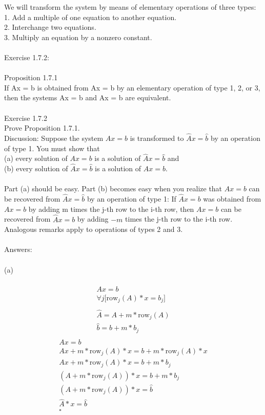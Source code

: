 \documentclass[10pt,a4paper]{article}
\author{Daniel Frederico Lins Leite}
\begin{document}
	We will transform the system by means of elementary operations of three types:\\ 
	1. Add a multiple of one equation to another equation.\\ 
	2. Interchange two equations.\\ 
	3. Multiply an equation by a nonzero constant.\\ 
	\\
	Exercise 1.7.2:\\
	\\
	Proposition 1.7.1\\
	If Ax = b is obtained from Ax = b by an elementary operation of type 1, 2, or 3, then the systems Ax = b and Ax = b are equivalent.\\
	\\
	Exercise 1.7.2\\
	Prove Proposition 1.7.1.\\
	Discussion: Suppose the system $Ax = b$ is transformed to $\hat{A}x = \hat{b}$ by an operation of type 1. You must show that\\
	(a) every solution of $Ax = b$ is a solution of $\hat{A}x = \hat{b}$ and\\
	(b) every solution of $\hat{A}x = \hat{b}$ is a solution of $Ax = b$.\\
	\\
	Part (a) should be easy. Part (b) becomes easy when you realize that $Ax = b$ can be recovered from $\hat{A}x = \hat{b}$ by an operation of type 1: If $\hat{A}x = b$ was obtained from $Ax = b$ by adding m times the j-th row to the i-th row, then $Ax = b$ can be recovered from $\hat{A}x = b$ by adding $-m$ times the j-th row to the i-th row. Analogous remarks apply to operations of types 2 and 3.\\
	\\
	Answers:\\
	\\
	(a)\\
	\\
	\begin{align*}
		Ax = b\\
		\forall{j} \big[ \text{row}_j(A) * x = b_j \big]\\
		\\
		\hat{A} = A + m*\text{row}_j(A)\\
		\hat{b} = b + m*b_j\\	
	\end{align*}
	\begin{align*}	
		Ax = b\\
		Ax + m*\text{row}_j(A)*x = b + m*\text{row}_j(A)*x\\		
		Ax + m*\text{row}_j(A)*x = b + m*b_j\\
		(A + m*\text{row}_j(A))*x = b + m*b_j\\
		(A + m*\text{row}_j(A))*x = \hat{b}\\
		\hat{A}*x = \hat{b}\\		
		\square
	\end{align*} 	
\end{document}
